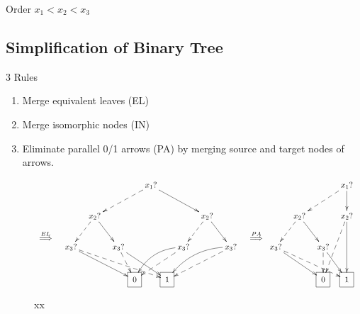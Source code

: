 Order $x_1<x_2<x_3$



\subsection{Simplification of Binary Tree}


3 Rules

\begin{enumerate}
\item Merge equivalent leaves (EL)
\item Merge isomorphic nodes (IN)
\item Eliminate parallel 0/1 arrows (PA) by merging source
and target nodes of arrows.
\end{enumerate}





\begin{figure}[h!]
$$
\xymatrix{
\\\\
\stackrel{EL}{\implies}}
\xymatrix@C=.1pc{
&&&&&&&x_1?\ar@{-->}[dllll]
\ar[drrrr]
\\
&&&x_2?\ar@{-->}[dll]\ar[drr]
&&&&&&&&x_2?\ar@{-->}[dll]\ar[drr]
\\
&x_3?\ar@{-->}[drrrrrrr]\ar[drrrrr]
&&&&x_3?\ar@{-->}[dr]\ar[drrr]
&&&&x_3?\ar@{-->}[dlll]\ar@/_1pc/[dlll]
&&&&x_3?\ar@{-->}[dlllll]\ar@/_1pc/[dlllll]
\\
&&
&&
&&\Rect{0}
&&\Rect{1}
&&
&&
&&
}
\xymatrix{
\\\\\stackrel{PA}{\implies}}
\xymatrix@C=.1pc{
&&&&&&x_1?\ar@{-->}[dllll]
\ar[d]
\\
&&x_2?\ar@{-->}[dll]\ar[drr]
&&&&x_2?\ar@{-->}[ddll]\ar[dd]
\\
x_3?\ar@{-->}[drrrrrr]\ar[drrrr]
&&&&x_3?\ar@{-->}[d]\ar[drr]
\\
&&
&&\Rect{0}
&&\Rect{1}
&&
&&
&&
}
$$
\caption{xx}
\label{fig-el-pa-example}
\end{figure}

